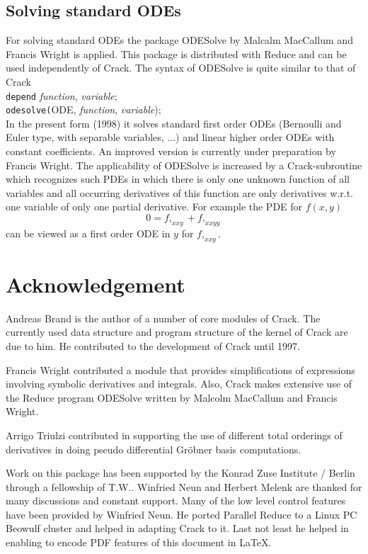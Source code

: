 \documentclass[12pt]{article}
\begin{document}
\subsection{Solving standard ODEs}
For solving standard ODEs the package {\sc ODESolve} by Malcalm MacCallum and
Francis Wright  
\cite{Mal} is applied. This package is distributed with {\sc Reduce} 
and can be used independently of {\sc Crack}. The syntax of
{\sc ODESolve} is quite similar to that of {\sc Crack} \\
\verb+depend+ {\it function}, {\it variable}; \\
\verb+odesolve(+ODE, {\it function}, {\it variable});  \\
In the present form (1998) it solves standard first order ODEs
(Bernoulli and Euler type, with separable variables, $\ldots$) and linear
higher order ODEs with constant coefficients. 
An improved version is currently under preparation by Francis Wright.
The applicability of {\sc ODESolve} is 
increased by a {\sc Crack}-subroutine which recognizes such PDEs in which
there is only one unknown function of all variables and all occurring
derivatives of this function
are only derivatives w.r.t. one variable of only one partial derivative.
For example the PDE for $f(x,y)$
\[ 0 = f,_{xxy} + f,_{xxyy} \]
can be viewed as a first order ODE in $y$ for $f,_{xxy}.$

\section*{Acknowledgement}
Andreas Brand is the author of a number of core modules of {\sc
Crack}. The currently used data structure and program structure of the
kernel of {\sc Crack} are due to him. He contributed to the
development of {\sc Crack} until 1997.

Francis Wright contributed a module that provides simplifications
of expressions involving symbolic derivatives and integrals. Also, {\sc Crack}
makes extensive use of the {\sc Reduce} program {\sc ODESolve} written
by Malcolm MacCallum and Francis Wright.

Arrigo Triulzi contributed in supporting the use of different total
orderings of derivatives in doing pseudo differential Gr\"{o}bner
basis computations.

Work on this package has been supported by the Konrad Zuse
Institute / Berlin through a fellowship of T.W..  Winfried
Neun and Herbert Melenk are thanked for many discussions and 
constant support. Many of the low level control features have
been provided by Winfried Neun. He ported Parallel Reduce to
a Linux PC Beowulf cluster and helped in adapting {\sc Crack} 
to it. Last not least he helped in enabling to encode PDF features of
this document in LaTeX.
\end{document}
